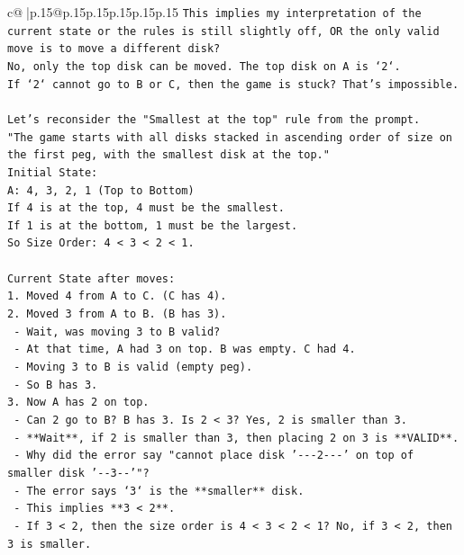 \documentclass{article}
\begin{document}
{\begin{supertabular}{c@{$\;$}|p{.15\linewidth}@{}p{.15\linewidth}p{.15\linewidth}p{.15\linewidth}p{.15\linewidth}p{.15\linewidth}}
{{{\texttt{This implies my interpretation of the current state or the rules is still slightly off, OR the only valid move is to move a different disk?} \\
\texttt{No, only the top disk can be moved. The top disk on A is `2`.} \\
\texttt{If `2` cannot go to B or C, then the game is stuck? That's impossible.} \\
\\ 
\texttt{Let's reconsider the "Smallest at the top" rule from the prompt.} \\
\texttt{"The game starts with all disks stacked in ascending order of size on the first peg, with the smallest disk at the top."} \\
\texttt{Initial State:} \\
\texttt{A: 4, 3, 2, 1 (Top to Bottom)} \\
\texttt{If 4 is at the top, 4 must be the smallest.} \\
\texttt{If 1 is at the bottom, 1 must be the largest.} \\
\texttt{So Size Order: 4 < 3 < 2 < 1.} \\
\\ 
\texttt{Current State after moves:} \\
\texttt{1. Moved 4 from A to C. (C has 4).} \\
\texttt{2. Moved 3 from A to B. (B has 3).} \\
\texttt{   {-} Wait, was moving 3 to B valid?} \\
\texttt{   {-} At that time, A had 3 on top. B was empty. C had 4.} \\
\texttt{   {-} Moving 3 to B is valid (empty peg).} \\
\texttt{   {-} So B has 3.} \\
\texttt{3. Now A has 2 on top.} \\
\texttt{   {-} Can 2 go to B? B has 3. Is 2 < 3? Yes, 2 is smaller than 3.} \\
\texttt{   {-} **Wait**, if 2 is smaller than 3, then placing 2 on 3 is **VALID**.} \\
\texttt{   {-} Why did the error say "cannot place disk '{-}{-}{-}2{-}{-}{-}' on top of smaller disk '{-}{-}3{-}{-}'"?} \\
\texttt{   {-} The error says `3` is the **smaller** disk.} \\
\texttt{   {-} This implies **3 < 2**.} \\
\texttt{   {-} If 3 < 2, then the size order is 4 < 3 < 2 < 1? No, if 3 < 2, then 3 is smaller.} \\
}}}
\end{supertabular}}
\end{document}
